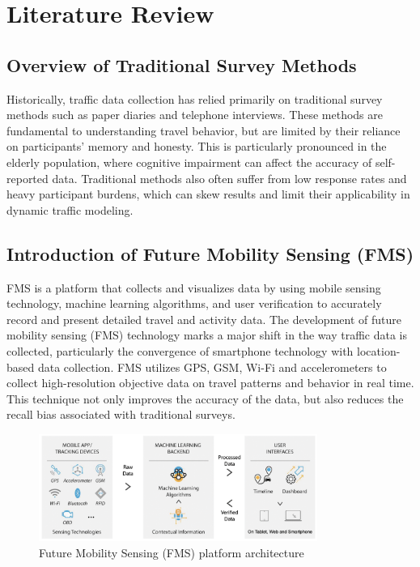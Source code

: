 \documentclass[12pt,two side]{report}
\begin{document}
\chapter{Literature Review}
\section{Overview of Traditional Survey Methods}
Historically, traffic data collection has relied primarily on traditional survey methods such as paper diaries and telephone interviews. These methods are fundamental to understanding travel behavior, but are limited by their reliance on participants' memory and honesty. This is particularly pronounced in the elderly population, where cognitive impairment can affect the accuracy of self-reported data. Traditional methods also often suffer from low response rates and heavy participant burdens, which can skew results and limit their applicability in dynamic traffic modeling.
\section{Introduction of Future Mobility Sensing (FMS)}
FMS is a platform that collects and visualizes data by using mobile sensing technology, machine learning algorithms, and user verification to accurately record and present detailed travel and activity data. The development of future mobility sensing (FMS) technology marks a major shift in the way traffic data is collected, particularly the convergence of smartphone technology with location-based data collection. FMS utilizes GPS, GSM, Wi-Fi and accelerometers to collect high-resolution objective data on travel patterns and behavior in real time. This technique not only improves the accuracy of the data, but also reduces the recall bias associated with traditional surveys.
\begin{figure}
\centering
\includegraphics[width=9.1cm]{background_report/figures/FMS.png}
\caption{Future Mobility Sensing (FMS) platform architecture}
\label{figure:1}
\end{figure}
\end{document}

